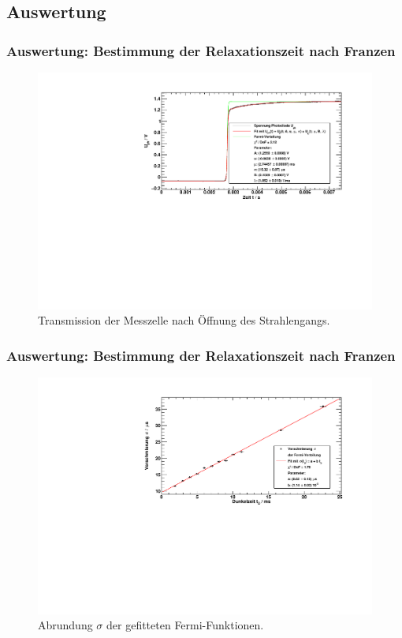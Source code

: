 \subsection{Auswertung}
\begin{frame}
\frametitle{Auswertung: Bestimmung der Relaxationszeit nach Franzen}

\begin{figure}
    \centering
    \includegraphics[width=\textwidth]{../img/04.pdf}
    \caption{Transmission der Messzelle nach Öffnung des Strahlengangs.}  
\end{figure} 
  
\end{frame}


\begin{frame}
\frametitle{Auswertung: Bestimmung der Relaxationszeit nach Franzen}

\begin{figure}
    \centering
    \includegraphics[width=\textwidth]{../img/sigmaFit.pdf}
    \caption{Abrundung $\sigma$ der gefitteten Fermi-Funktionen.}  
\end{figure} 
  
\end{frame}


